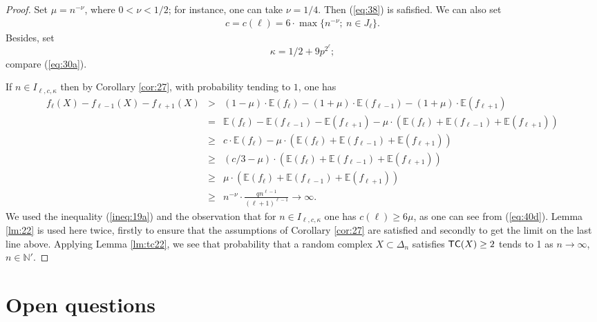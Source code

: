\documentclass[10pt,a4paper]{amsart}
\newtheorem{teo}[lema]{Theorem}
\newcommand{\N}{\mathbb{N}}
\newcommand{\E}{\mathbb{E}}
\newcommand{\tc}{{\sf{TC}}}
\begin{document}
\begin{proof}
Set $\mu=n^{-\nu}$, where $0<\nu<1/2$; for instance, one can take $\nu=1/4$. Then (\ref{eq:38}) is safisfied. 
We can also set 
\begin{eqnarray}\label{eq:40d}
c=c(\ell)= 6\cdot \max\{n^{-\nu};\  n\in J_\ell\}.
\end{eqnarray} 
Besides, set $$\kappa= 1/2 + 9p^{2^{\ell}};$$ compare (\ref{eq:30a}). 

If $n\in I_{\ell, c, \kappa}$ then by Corollary \ref{cor:27}, with probability tending to $1$, one has
\begin{eqnarray*}
f_\ell(X)-f_{\ell-1}(X)-f_{\ell+1}(X) &>& (1-\mu)\cdot \E(f_\ell) -(1+\mu)\cdot \E(f_{\ell-1}) -(1+\mu)\cdot \E(f_{\ell+1})\\
&=& \E(f_\ell)-\E(f_{\ell-1})-\E(f_{\ell+1}) - \mu\cdot(\E(f_\ell) +\E(f_{\ell-1})+\E(f_{\ell+1}))\\
&\ge & c\cdot \E(f_\ell) - \mu\cdot(\E(f_\ell) +\E(f_{\ell-1})+\E(f_{\ell+1}))\\
&\ge& (c/3 -\mu)\cdot (\E(f_\ell) +\E(f_{\ell-1})+\E(f_{\ell+1}))\\
&\ge & \mu \cdot (\E(f_\ell) +\E(f_{\ell-1})+\E(f_{\ell+1}))\\
&\ge & n^{-\nu}\cdot \frac{qn^{\ell-1}}{(\ell+1)^{\ell-1}}\to \infty. 
\end{eqnarray*}
We used the inequality (\ref{ineq:19a}) and the observation that for $n\in I_{\ell,c, \kappa}$ one has $c(\ell) \ge 6\mu$, as one can see from (\ref{eq:40d}). %
Lemma \ref{lm:22} is used here twice, firstly to ensure that the assumptions of Corollary \ref{cor:27} are satisfied and secondly to get 
the limit on the last line above. 
Applying  Lemma \ref{lm:tc22}, we see that probability that a random complex $X\subset \Delta_n$ satisfies $\tc(X)\ge 2$ tends to 1 as $n\to \infty$, $n\in \N'$. 
\end{proof}

\section{Open questions}
\end{document}
